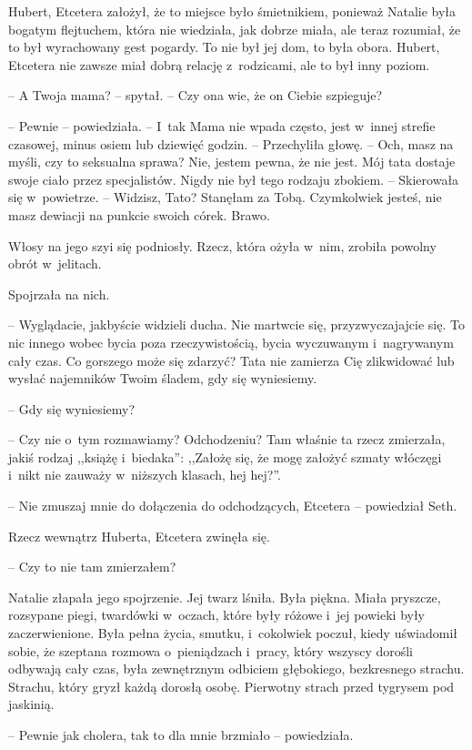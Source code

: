 \documentclass[oneside,polish,11pt,sfheadings]{mwbk}
\begin{document}
Hubert, Etcetera założył, że to miejsce było śmietnikiem, ponieważ
Natalie była bogatym flejtuchem, która nie wiedziała, jak dobrze miała,
ale teraz rozumiał, że to był wyrachowany gest pogardy. To nie był jej
dom, to była obora. Hubert, Etcetera nie zawsze miał dobrą relację z~rodzicami, ale to był inny poziom.

-- A Twoja mama? -- spytał. -- Czy ona wie, że on Ciebie szpieguje?

-- Pewnie -- powiedziała. -- I~tak Mama nie wpada często, jest w~innej
strefie czasowej, minus osiem lub dziewięć godzin. -- Przechyliła głowę.
-- Och, masz na myśli, czy to seksualna sprawa? Nie, jestem pewna, że nie
jest. Mój tata dostaje swoje ciało przez specjalistów. Nigdy nie był
tego rodzaju zbokiem. -- Skierowała się w~powietrze. -- Widzisz, Tato?
Stanęłam za Tobą. Czymkolwiek jesteś, nie masz dewiacji na punkcie
swoich córek. Brawo.

Włosy na jego szyi się podniosły. Rzecz, która ożyła w~nim, zrobiła
powolny obrót w~jelitach.

Spojrzała na nich. 

-- Wyglądacie, jakbyście widzieli ducha. Nie martwcie
się, przyzwyczajajcie się. To nic innego wobec bycia poza
rzeczywistością, bycia wyczuwanym i~nagrywanym cały czas. Co gorszego
może się zdarzyć? Tata nie zamierza Cię zlikwidować lub wysłać
najemników Twoim śladem, gdy się wyniesiemy.

-- Gdy się wyniesiemy?

-- Czy nie o~tym rozmawiamy? Odchodzeniu? Tam właśnie ta rzecz zmierzała,
jakiś rodzaj ,,książę i~biedaka'': ,,Założę się, że mogę założyć szmaty
włóczęgi i~nikt nie zauważy w~niższych klasach, hej hej?''.

-- Nie zmuszaj mnie do dołączenia do odchodzących, Etcetera -- powiedział
Seth.

Rzecz wewnątrz Huberta, Etcetera zwinęła się. 

-- Czy to nie tam
zmierzałem?

Natalie złapała jego spojrzenie. Jej twarz lśniła. Była piękna. Miała
pryszcze, rozsypane piegi, twardówki w~oczach, które były różowe i~jej
powieki były zaczerwienione. Była pełna życia, smutku, i~cokolwiek
poczuł, kiedy uświadomił sobie, że szeptana rozmowa o~pieniądzach i~pracy, który wszyscy dorośli odbywają cały czas, była zewnętrznym
odbiciem głębokiego, bezkresnego strachu. Strachu, który gryzł każdą
dorosłą osobę. Pierwotny strach przed tygrysem pod jaskinią.

-- Pewnie jak cholera, tak to dla mnie brzmiało -- powiedziała.
\end{document}
